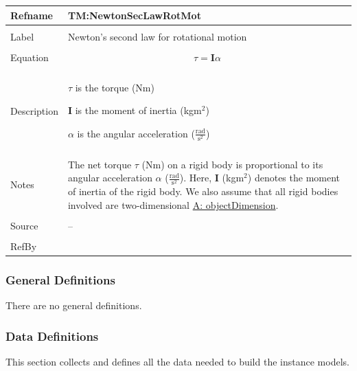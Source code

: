\documentclass[12pt]{article}
\begin{document}
\noindent \begin{minipage}{\textwidth}
\begin{tabular}{p{} p{}}
\toprule \textbf{Refname} & \textbf{TM:NewtonSecLawRotMot}
\label{TM:NewtonSecLawRotMot}
\\ \midrule \\
Label & Newton's second law for rotational motion
\\ \midrule \\
Equation & \begin{displaymath}
           τ=\mathbf{I} α
           \end{displaymath}
\\ \midrule \\
Description & \begin{symbDescription}
              \item{$τ$ is the torque (Nm)}
              \item{$\mathbf{I}$ is the moment of inertia (kg$\text{m}^{2}$)}
              \item{$α$ is the angular acceleration ($\frac{\text{rad}}{\text{s}^{2}}$)}
              \end{symbDescription}
\\ \midrule \\
Notes & The net torque $τ$ (Nm) on a rigid body is proportional to its angular acceleration $α$ ($\frac{\text{rad}}{\text{s}^{2}}$). Here, $\mathbf{I}$ (kg$\text{m}^{2}$) denotes the moment of inertia of the rigid body. We also assume that all rigid bodies involved are two-dimensional \hyperref[assumpOD]{A: objectDimension}.
\\ \midrule \\
Source & --
\\ \midrule \\
RefBy & 
\\ \bottomrule \end{tabular}
\end{minipage}
\subsubsection{General Definitions}
\label{Sec:GDs}
There are no general definitions.
\subsubsection{Data Definitions}
\label{Sec:DDs}
This section collects and defines all the data needed to build the instance models.
\par~
\end{document}
